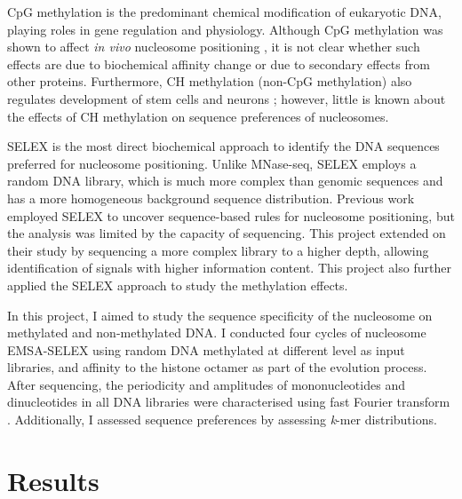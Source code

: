 \documentclass[a4paper, numbers=noenddot]{scrbook}
\begin{document}
CpG methylation is the predominant chemical modification of eukaryotic DNA, playing roles in gene regulation and physiology. Although CpG methylation was shown to affect \emph{in vivo} nucleosome positioning \citep{kelly_genome-wide_2012}, it is not clear whether such effects are due to biochemical affinity change or due to secondary effects from other proteins.  Furthermore, CH methylation (non-CpG methylation) also regulates development of stem cells and neurons \citep{guo_distribution_2014}; however, little is known about the effects of CH methylation on sequence preferences of nucleosomes.

SELEX is the most direct biochemical approach to identify the DNA sequences preferred for nucleosome positioning.  Unlike MNase-seq, SELEX employs a random DNA library, which is much more complex than genomic sequences and has a more homogeneous background sequence distribution.  Previous work \citep{lowary_new_1998} employed SELEX to uncover sequence-based rules for nucleosome positioning, but the analysis was limited by the capacity of sequencing.  This project extended on their study by sequencing a more complex library to a higher depth, allowing identification of signals with higher information content.  This project also further applied the SELEX approach to study the methylation effects.

In this project, I aimed to study the sequence specificity of the nucleosome on methylated and non-methylated DNA.  I conducted four cycles of nucleosome EMSA-SELEX using random DNA methylated at different level as input libraries, and affinity to the histone octamer as part of the evolution process.  After sequencing, the periodicity and amplitudes of mononucleotides and dinucleotides in all DNA libraries were characterised using fast Fourier transform \citep{lowary_new_1998, zhu_interaction_2018}.  Additionally, I assessed sequence preferences by assessing \emph{k}-mer distributions.

\section{Results}
\label{sec:emsaselex_results}
\end{document}
